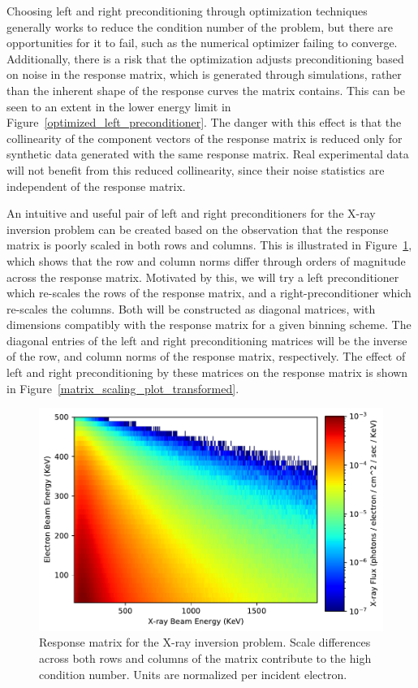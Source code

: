 Choosing left and right preconditioning through optimization techniques generally works to reduce the condition number of the problem, but there are opportunities for it to fail, such as the numerical optimizer failing to converge. Additionally, there is a risk that the optimization adjusts preconditioning based on noise in the response matrix, which is generated through simulations, rather than the inherent shape of the response curves the matrix contains. This can be seen to an extent in the lower energy limit in Figure~\ref{optimized_left_preconditioner}. The danger with this effect is that the collinearity of the component vectors of the response matrix is reduced only for synthetic data generated with the same response matrix. Real experimental data will not benefit from this reduced collinearity, since their noise statistics are independent of the response matrix. 

An intuitive and useful pair of left and right preconditioners for the X-ray inversion problem can be created based on the observation that the response matrix is poorly scaled in both rows and columns. This is illustrated in Figure~\ref{matrix_scaling_plot}, which shows that the row and column norms differ through orders of magnitude across the response matrix. Motivated by this, we will try a left preconditioner which re-scales the rows of the response matrix, and a right-preconditioner which re-scales the columns. Both will be constructed as diagonal matrices, with dimensions compatibly with the response matrix for a given binning scheme. The diagonal entries of the left and right preconditioning matrices will be the inverse of the row, and column norms of the response matrix, respectively. The effect of left and right preconditioning by these matrices on the response matrix is shown in Figure~\ref{matrix_scaling_plot_transformed}.

\begin{figure}[p]
    \centering
    \includegraphics[width=1.1\textwidth]{figures/chapter_4/matrix_scaling_plot/fig.pdf}
    \caption{Response matrix for the X-ray inversion problem. Scale differences across both rows and columns of the matrix contribute to the high condition number. Units are normalized per incident electron.}
    \label{matrix_scaling_plot}
\end{figure}

